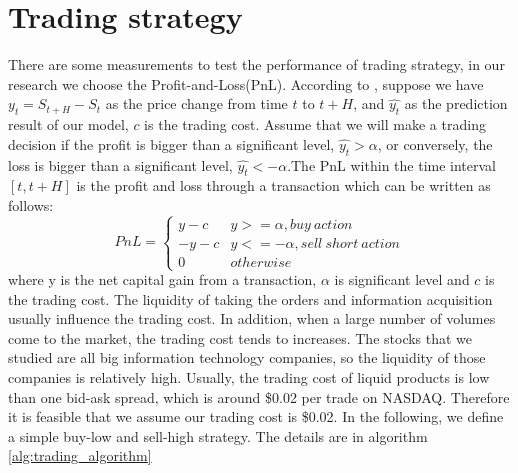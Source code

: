 \section{Trading strategy}
There are some measurements to test the performance of trading strategy,   in our research we choose the Profit-and-Loss(PnL). 
According to \cite{zhou2015evolution},  suppose we have $y_t=S_{t+H}-S_t$ as the price change from time $t$ to $t+H$,   and $\hat{y_t}$ as the prediction result of our model,   $c$ is the trading cost. Assume that we will make a trading decision if the profit is bigger than a significant level,   $\hat{y_t}>\alpha$,   or conversely,   the loss is bigger than a significant level,  $\hat{y_t}<-\alpha$.The PnL within the time interval $[t,  t+H]$ is the profit and loss through a transaction which can be written as follows:\\
\begin{equation}       
PnL=\left\{          
  \begin{array}{ll}   
    y-c  & y>=\alpha,   buy\ action   \\  
     -y-c & y<=-\alpha,   sell\ short\ action \\
     0 & otherwise
  \end{array}
\right.       
\end{equation}
where y is the net capital gain from a transaction,   $\alpha$ is significant level and $c$ is the trading cost. The liquidity of taking the orders and information acquisition usually influence the trading cost. In addition, when a large number of volumes come to the market,   the trading cost tends to increases. The stocks that we studied are all big information technology companies,   so the liquidity of those companies is relatively high. Usually,   the trading cost of liquid products is low than one bid-ask spread,   which is around \$0.02 per trade on NASDAQ. Therefore it is feasible that we assume our trading cost is \$0.02.
In the following,  we define a simple buy-low and sell-high strategy. The details are in algorithm \ref{alg:trading_algorithm}


